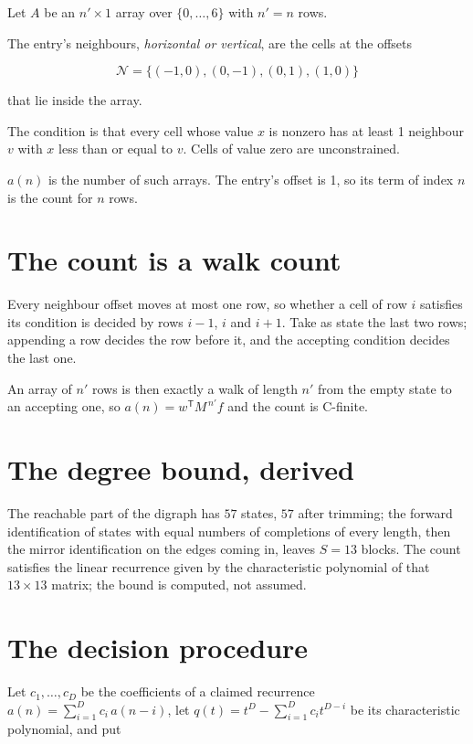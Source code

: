 \documentclass[11pt]{article}
\theoremstyle{definition}
\begin{document}
Let $A$ be an $n' \times 1$ array over $\{0,\dots,6\}$ with $n' = n$ rows.

The entry's neighbours, {\itshape horizontal or vertical}, are the cells at the offsets

\[\mathcal{N} = \{(-1,0), (0,-1), (0,1), (1,0)\}\]

that lie inside the array.

The condition is that every cell whose value $x$ is nonzero has at least 1 neighbour $v$ with $x$ less than or equal to $v$. Cells of value zero are unconstrained.

$a(n)$ is the number of such arrays. The entry's offset is 1, so its term of index $n$ is the count for $n$ rows.

\section{The count is a walk count}

Every neighbour offset moves at most one row, so whether a cell of row $i$ satisfies its condition is decided by rows $i-1$, $i$ and $i+1$. Take as state the last two rows; appending a row decides the row before it, and the accepting condition decides the last one.

An array of $n'$ rows is then exactly a walk of length $n'$ from the empty state to an accepting one, so $a(n) = w^{\mathsf T}M^{\,n'}f$ and the count is C-finite.

\section{The degree bound, derived}

The reachable part of the digraph has $57$ states, $57$ after trimming; the forward identification of states with equal numbers of completions of every length, then the mirror identification on the edges coming in, leaves $S = 13$ blocks. The count satisfies the linear recurrence given by the characteristic polynomial of that $13\times13$ matrix; the bound is computed, not assumed.

\section{The decision procedure}

Let $c_1,\dots,c_D$ be the coefficients of a claimed recurrence $a(n) = \sum_{i=1}^{D} c_i\,a(n-i)$, let $q(t) = t^{D} - \sum_{i=1}^{D} c_i t^{D-i}$ be its characteristic polynomial, and put
\end{document}
